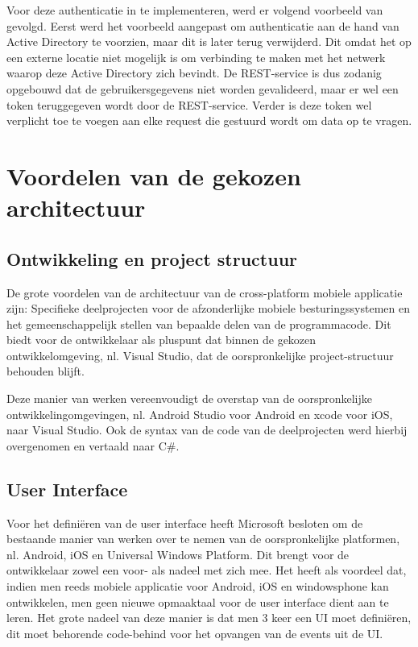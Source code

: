 Voor deze authenticatie in te implementeren, werd er volgend voorbeeld van \cite{authenticatemvcapplication2017} gevolgd.
Eerst werd het voorbeeld aangepast om authenticatie aan de hand van Active Directory te voorzien, maar dit is later terug verwijderd.
Dit omdat het op een externe locatie niet mogelijk is om verbinding te maken met het netwerk waarop deze Active Directory zich bevindt.
De REST-service is dus zodanig opgebouwd dat de gebruikersgegevens niet worden gevalideerd, maar er wel een token teruggegeven wordt door de REST-service.
Verder is deze token wel verplicht toe te voegen aan elke request die gestuurd wordt om data op te vragen.

\label{sec:voordelenvandegekozenapparchitectuur}
\section{Voordelen van de gekozen architectuur}
\subsection{Ontwikkeling en project structuur}
De grote voordelen van de architectuur van de cross-platform mobiele applicatie zijn: Specifieke deelprojecten voor de afzonderlijke
mobiele besturingssystemen en het gemeenschappelijk stellen van bepaalde delen van de programmacode. Dit biedt voor de ontwikkelaar
als pluspunt dat binnen de gekozen ontwikkelomgeving, nl. Visual Studio, dat de oorspronkelijke project-structuur behouden blijft.

Deze manier van werken vereenvoudigt de overstap van de oorspronkelijke ontwikkelingomgevingen, nl. Android Studio voor Android en xcode voor iOS, naar Visual Studio.
Ook de syntax van de code van de deelprojecten werd hierbij overgenomen en vertaald naar C\#.




\subsection{User Interface}
Voor het definiëren van de user interface heeft Microsoft besloten om de bestaande manier van werken over te nemen van de oorspronkelijke platformen, nl. Android, iOS en Universal Windows Platform.
Dit brengt voor de ontwikkelaar zowel een voor- als nadeel met zich mee. Het heeft als voordeel dat, indien men reeds mobiele applicatie voor Android, iOS en windowsphone kan ontwikkelen, men geen
nieuwe opmaaktaal voor de user interface dient aan te leren. Het grote nadeel van deze manier is dat men 3 keer een UI moet definiëren,
dit moet behorende code-behind voor het opvangen van de events uit de UI.

